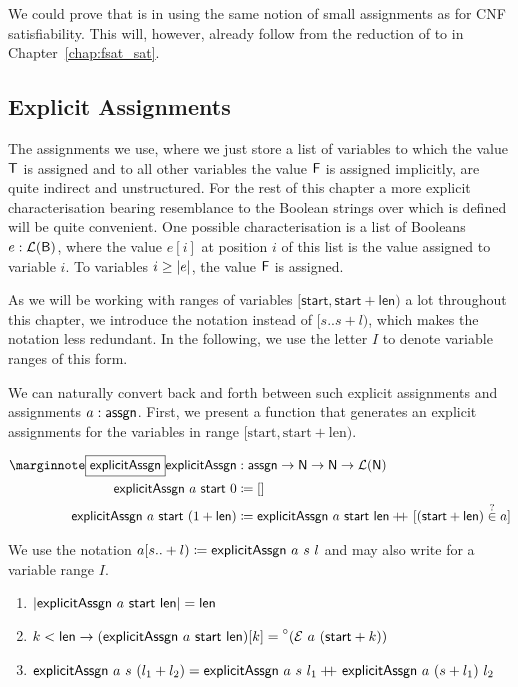 We could prove that \fsat{} is in \NP{} using the same notion of small assignments as for CNF satisfiability. This will, however, already follow from the reduction of \fsat{} to \SAT{} in Chapter~\ref{chap:fsat_sat}. 

\subsection{Explicit Assignments}
The assignments we use, where we just store a list of variables to which the value $\mathsf{T}$ is assigned and to all other variables the value $\mathsf{F}$ is assigned implicitly, are quite indirect and unstructured. 
For the rest of this chapter a more explicit characterisation bearing resemblance to the Boolean strings over which \BPR{} is defined will be quite convenient.
One possible characterisation is a list of Booleans $e : \mathcal{L} (\textsf{B})$, where the value $e[i]$ at position $i$ of this list is the value assigned to variable $i$. To variables $i \ge |e|$, the value $\mathsf{F}$ is assigned.

As we will be working with ranges of variables $[\textsf{start}, \textsf{start} + \textsf{len})$ a lot throughout this chapter, we introduce the notation \mnotec{$[s .. +l)$} instead of $[s .. s+l)$, which makes the notation less redundant. In the following, we use the letter $I$ to denote variable ranges of this form.

We can naturally convert back and forth between such explicit assignments and assignments $a : \textsf{assgn}$.
First, we present a function that generates an explicit assignments for the variables in range $[\text{start}, \text{start} + \text{len})$. 

\newcommand{\explicitA}{\textsf{explicitAssgn}}
\begin{align*}
  \mnote{\explicitA}
  \explicitA &: \assgn \rightarrow \nat \rightarrow \nat \rightarrow \listsof{\nat} \\
  \explicitA~a~\textsf{start}~0 &\defeq \nil \\
  \explicitA~a~\textsf{start}~(\natS{\textsf{len}}) &\defeq \explicitA~a~\textsf{start}~\textsf{len} \concat [(\textsf{start} + \textsf{len}) \overset{?}{\in} a]
\end{align*}

We use the notation $a[s ..+l) \defeq \explicitA~a~s~l$ and may also write  for a variable range $I$.

\begin{lemma}[Properties of \explicitA]\leavevmode
  \begin{enumerate}
    \item $\length{\explicitA~a~\textsf{start}~\textsf{len}} = \textsf{len}$
    \item $k < \textsf{len} \rightarrow (\explicitA~a~\textsf{start}~\textsf{len})[k] = \OSome{(\evalA{a}{(\textsf{start} + k)})}$
    \item $\explicitA~a~s~(l_1 + l_2) = \explicitA~a~s~l_1 \concat \explicitA~a~(s + l_1)~l_2$ 
  \end{enumerate}
\end{lemma}


